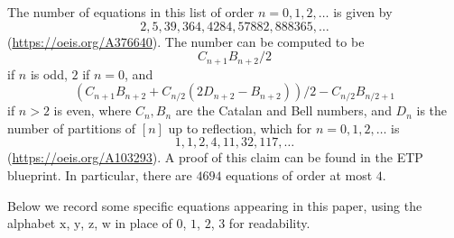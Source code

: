 \documentclass[12pt]{amsart}
\theoremstyle{definition}
\newcommand{\x}{\mathrm{x}}
\newcommand{\y}{\mathrm{y}}
\newcommand{\z}{\mathrm{z}}
\newcommand{\w}{\mathrm{w}}
\begin{document}
The number of equations in this list of order $n=0,1,2,\dots$ is given by
$$ 2, 5, 39, 364, 4284, 57882, 888365, \dots$$
(\url{https://oeis.org/A376640}).  The number can be computed to be
$$ C_{n+1} B_{n+2}/2$$
if $n$ is odd, $2$ if $n=0$, and
$$ (C_{n+1} B_{n+2}+ C_{n/2}(2D_{n+2}-B_{n+2}))/2 - C_{n/2} B_{n/2+1}$$
if $n > 2$ is even, where $C_n, B_n$ are the Catalan and Bell numbers, and $D_n$ is the number of partitions of $[n]$ up to reflection, which for $n=0,1,2,\dots$ is
$$ 1, 1, 2, 4, 11, 32, 117, \dots$$
(\url{https://oeis.org/A103293}).  A proof of this claim can be found in the ETP blueprint.  In particular, there are $4694$ equations of order at most $4$.

Below we record some specific equations appearing in this paper, using the alphabet $\x$, $\y$, $\z$, $\w$ in place of $0$, $1$, $2$, $3$ for readability.
\begingroup\allowdisplaybreaks
\end{document}
